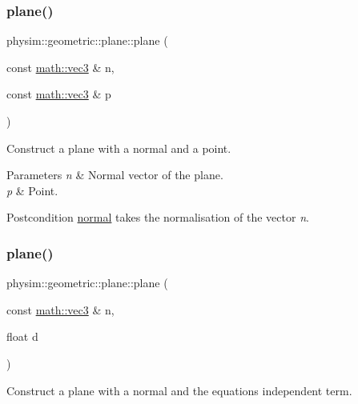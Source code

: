 \subsubsection{\texorpdfstring{plane()}{plane()}\hspace{0.1cm}{\footnotesize\ttfamily [1/3]}}
{\footnotesize\ttfamily physim\+::geometric\+::plane\+::plane (\begin{DoxyParamCaption}\item[{const \hyperlink{structphysim_1_1math_1_1vec3}{math\+::vec3} \&}]{n,  }\item[{const \hyperlink{structphysim_1_1math_1_1vec3}{math\+::vec3} \&}]{p }\end{DoxyParamCaption})}



Construct a plane with a normal and a point. 


\begin{DoxyParams}{Parameters}
{\em n} & Normal vector of the plane. \\
\hline
{\em p} & Point. \\
\hline
\end{DoxyParams}
\begin{DoxyPostcond}{Postcondition}
\hyperlink{classphysim_1_1geometric_1_1plane_a373cd794f689cf83458f6c6f051b59d9}{normal} takes the normalisation of the vector {\itshape n}. 
\end{DoxyPostcond}
\mbox{\label{classphysim_1_1geometric_1_1plane_a3888aab8477d2f1e182bef0955b8e351}} 
\subsubsection{\texorpdfstring{plane()}{plane()}\hspace{0.1cm}{\footnotesize\ttfamily [2/3]}}
{\footnotesize\ttfamily physim\+::geometric\+::plane\+::plane (\begin{DoxyParamCaption}\item[{const \hyperlink{structphysim_1_1math_1_1vec3}{math\+::vec3} \&}]{n,  }\item[{float}]{d }\end{DoxyParamCaption})}



Construct a plane with a normal and the equation\textquotesingle{}s independent term. 

